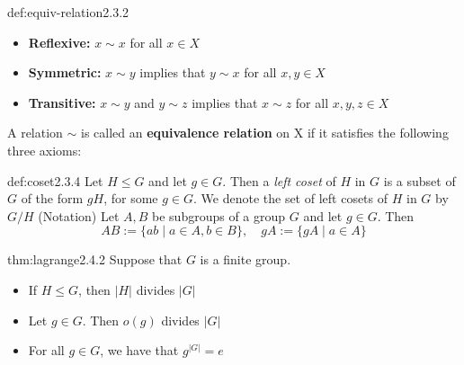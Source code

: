 \documentclass[landscape, 8pt]{extarticle}
\begin{document}
\begin{multicols}{3}
\begin{dfn}{def:equiv-relation}{2.3.2}
    \renewcommand\labelitemi{\tiny$\bullet$}
    \begin{itemize}
        \setlength\itemsep{0em}
        \item \textbf{Reflexive:} $x\sim x$ for all $x\in X$
        \item \textbf{Symmetric:} $x\sim y$ implies that $y\sim x$ for all $x,y\in X$
        \item \textbf{Transitive:} $x\sim y$ and $y\sim z$ implies that $x\sim z$ for all $x,y,z\in X$
    \end{itemize}
    A relation $\sim$ is called an \textbf{equivalence relation} on X if it satisfies the following three axioms:  
\end{dfn}
\vspace{-5pt}

\begin{dfn}[Coset]{def:coset}{2.3.4}
    Let $H\le G$ and let $g\in G$. Then a \textit{left coset} of  $H$ in $G$ is a subset of $G$ of the form $gH$, for some $g\in G$.
    We denote the set of left cosets of $H$ in $G$ by $G/H$
    \vspace{0pt}\newline
    (Notation) Let $A, B$ be subgroups of a group $G$ and let $g\in G$. Then
    \[AB:=\{ab\mid a\in A, b\in B\},\quad gA:=\{gA\mid a\in A\}\]
\end{dfn}
\vspace{-5pt}

\begin{thm}{thm:lagrange}{2.4.2}
    Suppose that $G$ is a finite group.
    \renewcommand\labelitemi{\tiny$\bullet$}
    \begin{itemize}
        \setlength\itemsep{0em}
        \item If $H\le G$, then $\lvert  H\rvert $ divides $\lvert G\rvert $
        \item Let $g\in G$. Then $o(g)$ divides $\lvert  G\rvert $
        \item For all $g\in G$, we have that $g^{\lvert G\rvert } = e$
    \end{itemize}
\end{thm}
\vspace{-5pt}

\newpage



\end{multicols}
\end{document}
